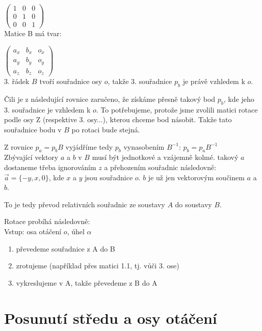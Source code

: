 \documentclass[a4paper,12pt]{book}
\begin{document}
$\begin{pmatrix}
1 & 0 & 0\\
0 & 1 & 0\\
0 & 0 & 1
\end{pmatrix}$\\

Matice B má tvar:

$\begin{pmatrix}
a_x& b_x& o_x\\
a_y & b_y& o_y\\
a_z & b_z & o_z
\end{pmatrix}$\\

3. řádek $B$ tvoří souřadnice osy $o$, takže 3. souřadnice $p_b$ je právě vzhledem k $o$.

Čili je z následující rovnice zaručeno, že získáme přesně takový bod $p_b$, kde jeho 3. souřadnice je vzhledem k $o$. To potřebujeme, protože jsme zvolili matici
rotace podle osy Z (respektive 3. osy...), kterou chceme bod násobit. Takže tato souřadnice bodu v $B$ po rotaci bude stejná.

Z rovnice $p_a = p_b B$ vyjádříme tedy $p_b$ vynasobením $B^{-1}$: $p_b = p_a B^{-1}$\\ %


Zbývající vektory $a$ a $b$ v $B$ musí být jednotkové a vzájemně kolmé. takový $a$ dostaneme třeba ignorováním $z$ a přehozením souřadnic následovně: $\vec{a} = \{-y, x, 0\}$, kde $x$ a $y$ jsou souřadnice $o$. $b$ je už jen vektorovým součinem $a$ a $b$.

To je tedy převod relativních souřadnic ze soustavy $A$ do soustavy $B$.




Rotace probíhá následovně:\\

Vstup: osa otáčení $o$, úhel $\alpha$

\begin{enumerate}[label=\arabic*, font=\bfseries] %
	\item převedeme souřadnice z A do B
	\item zrotujeme (například přes matici 1.1, tj. vůči 3. ose)
	\item vykreslujeme v A, takže převedeme z B do A
\end{enumerate}



\section{Posunutí středu a osy otáčení}
\end{document}
